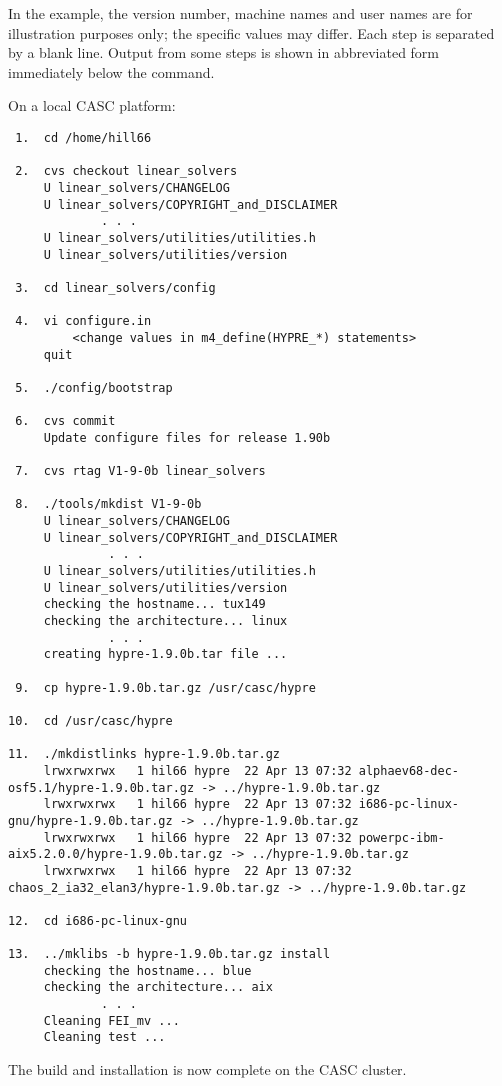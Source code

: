 In the example, the version number, machine names and user names are for illustration 
purposes only; the specific values may differ. Each step is separated by a blank line.
Output from some steps is shown in abbreviated form immediately below the command.

On a local CASC platform:
\begin{verbatim}
 1.  cd /home/hill66

 2.  cvs checkout linear_solvers
     U linear_solvers/CHANGELOG
     U linear_solvers/COPYRIGHT_and_DISCLAIMER
             . . .
     U linear_solvers/utilities/utilities.h
     U linear_solvers/utilities/version

 3.  cd linear_solvers/config

 4.  vi configure.in
         <change values in m4_define(HYPRE_*) statements>
     quit

 5.  ./config/bootstrap

 6.  cvs commit
     Update configure files for release 1.90b

 7.  cvs rtag V1-9-0b linear_solvers

 8.  ./tools/mkdist V1-9-0b
     U linear_solvers/CHANGELOG
     U linear_solvers/COPYRIGHT_and_DISCLAIMER
              . . .
     U linear_solvers/utilities/utilities.h
     U linear_solvers/utilities/version
     checking the hostname... tux149
     checking the architecture... linux
              . . .
     creating hypre-1.9.0b.tar file ...

 9.  cp hypre-1.9.0b.tar.gz /usr/casc/hypre

10.  cd /usr/casc/hypre

11.  ./mkdistlinks hypre-1.9.0b.tar.gz
     lrwxrwxrwx   1 hil66 hypre  22 Apr 13 07:32 alphaev68-dec-osf5.1/hypre-1.9.0b.tar.gz -> ../hypre-1.9.0b.tar.gz
     lrwxrwxrwx   1 hil66 hypre  22 Apr 13 07:32 i686-pc-linux-gnu/hypre-1.9.0b.tar.gz -> ../hypre-1.9.0b.tar.gz
     lrwxrwxrwx   1 hil66 hypre  22 Apr 13 07:32 powerpc-ibm-aix5.2.0.0/hypre-1.9.0b.tar.gz -> ../hypre-1.9.0b.tar.gz
     lrwxrwxrwx   1 hil66 hypre  22 Apr 13 07:32 chaos_2_ia32_elan3/hypre-1.9.0b.tar.gz -> ../hypre-1.9.0b.tar.gz

12.  cd i686-pc-linux-gnu

13.  ../mklibs -b hypre-1.9.0b.tar.gz install
     checking the hostname... blue
     checking the architecture... aix
             . . .
     Cleaning FEI_mv ...
     Cleaning test ...
\end{verbatim}
The build and installation is now complete on the CASC cluster.

